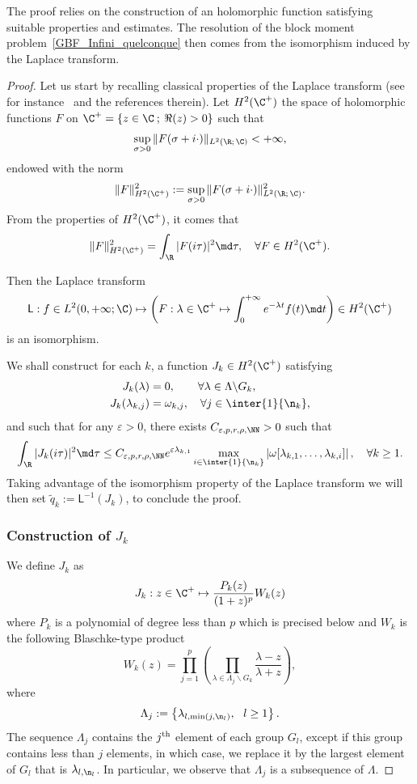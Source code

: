 The proof relies on the construction of an holomorphic function satisfying suitable properties and estimates. The resolution of the block moment problem~\eqref{GBF_Infini_quelconque} then comes from the isomorphism induced by the Laplace transform.
\begin{proof}
Let us start by recalling classical properties of the Laplace transform (see for instance~\cite[pp.~19-20]{SchwartzThese} and the references therein). Let $H^2(\C^+)$ the space of holomorphic functions $F$ on $\C^+ = \{ z \in \C \: ; \: \Re(z) >0 \}$ such that
\[
\sup_{\sigma >0 } \| F(\sigma + i \cdot) \|_{L^2(\R ;\,\C)} < + \infty,
\]
endowed with the norm
\[
\| F \|_{H^2(\C^+)}^2 := \sup_{\sigma >0 } \| F(\sigma + i \cdot) \|^2_{L^2(\R ;\,\C)}.
\]
From the properties of $H^2(\C^+)$, it comes that
\[
\| F \|_{H^2(\C^+)}^2 = \int_\R | F(i \tau)|^2 \md \tau, \quad \forall F \in H^2(\C^+).
\]


\goodbreak
Then the Laplace transform
\[
\mathsf{L} : f \in L^2(0,+\infty ; \C) \mapsto \left(F : \lambda \in \C^+ \mapsto \int_0^{+\infty} e^{-\lambda t } f(t) \md t \right) \in H^2(\C^+)
\]
is an isomorphism.

We shall construct for each $k$, a function $J_k \in H^2(\C^+)$ satisfying
\begin{align}\label{ProprietesJk1}
J_k(\lambda) &= 0, \qquad \forall \lambda \in \Lambda \backslash G_k,
\\
J_k(\lambda_{k,j}) &= \omega_{k,j}, \quad \forall j \in \inter{1}{\n_k},\label{ProprietesJk2}
\end{align}
and such that for any $\varepsilon >0$, there exists $C_{\varepsilon, p, r, \rho, \NN}>0$ such that
\[
\int_\R | J_k(i \tau)|^2 \md \tau \leq C_{\varepsilon, p, r, \rho, \NN} e^{\varepsilon \lambda_{k,1}} \max \limits_{i\in \inter{1}{\n_k}} \left| \omega[\lambda_{k,1}, \dots, \lambda_{k,i}] \right|, \quad \forall k \geq 1.
\]
Taking advantage of the isomorphism property of the Laplace transform we will then set $\widetilde{q}_k := \mathsf{L}^{-1} (J_k)$, to conclude the proof.


\subsubsection{Construction of $J_k$}
We define $J_k$ as
\begin{equation*}\label{Forme_Jk}
J_k : z \in \C^+ \mapsto \frac{P_k(z)}{(1+z)^p} W_k(z)
\end{equation*}
where $P_k$ is a polynomial of degree less than $p$ which is precised below and $W_k$ is the following Blaschke-type product
\[
W_k(z) = \prod_{j=1}^p \left(\prod_{\lambda \in \Lambda_j \backslash G_k} \frac{\lambda-z}{\lambda+z}\right),
\]
where
\begin{equation}\label{def_Lambda_j}
\Lambda_j:=\left\{\lambda_{l,\min(j,\n_l)},\ \ l\geq 1\right\}.
\end{equation}
The sequence $\Lambda_j$ contains the $j^{\rm th}$ element of each group $G_l$, except if this group contains less than $j$ elements, in which case, we replace it by the largest element of $G_l$ that is $\lambda_{l,\n_l}$. In particular, we observe that $\Lambda_j$ is a subsequence of $\Lambda$.



\end{proof}
